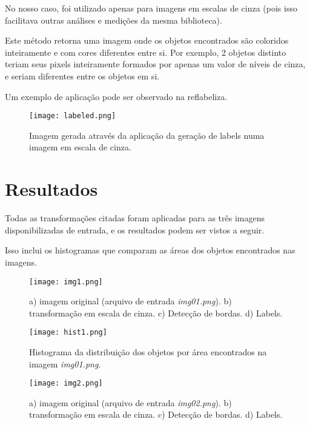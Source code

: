 \documentclass[conference]{IEEEtran}
\begin{document}
        No nosso caso, foi utilizado apenas para imagens em escalas de cinza (pois isso facilitava outras análises e medições da mesma biblioteca).

        Este método retorna uma imagem onde os objetos encontrados são coloridos inteiramente e com cores diferentes entre si. Por exemplo, 2 objetos distinto teriam seus pixels inteiramente formados por apenas um valor de níveis de cinza, e seriam diferentes entre os objetos em si.

        Um exemplo de aplicação pode ser observado na \imagem ref{labeliza}.

        \begin{figure}[ht]
            \centering
            \texttt{[image: labeled.png]}
            \caption{Imagem gerada através da aplicação da geração de labels numa imagem em escala de cinza.}
            \label{labeliza}
        \end{figure}

\section{Resultados}

    Todas as transformações citadas foram aplicadas para as três imagens disponibilizadas de entrada, e os resultados podem ser vistos a seguir.

    Isso inclui os histogramas que comparam as áreas dos objetos encontrados nas imagens.


    \begin{figure}[ht]
        \centering
        \texttt{[image: img1.png]}
        \caption{a) imagem original (arquivo de entrada \textit{img01.png}). b) transformação em escala de cinza. c) Detecção de bordas. d) Labels.}
        \label{img1}
    \end{figure}

    \begin{figure}[ht]
        \centering
        \texttt{[image: hist1.png]}
        \caption{Histograma da distribuição dos objetos por área encontrados na imagem \textit{img01.png}.}
        \label{hist1}
    \end{figure}

    \begin{figure}[ht]
        \centering
        \texttt{[image: img2.png]}
        \caption{a) imagem original (arquivo de entrada \textit{img02.png}). b) transformação em escala de cinza. c) Detecção de bordas. d) Labels.}
        \label{img2}
    \end{figure}
\end{document}

